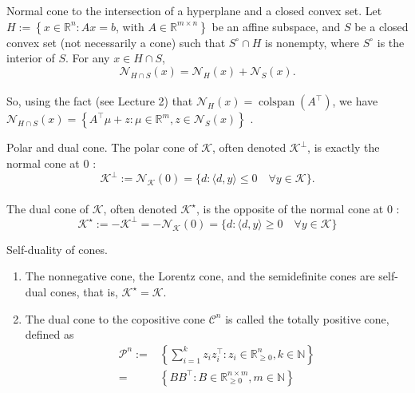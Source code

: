 \begin{theorem}[L9.1]{Normal cone to the intersection of a hyperplane and a closed convex set.}
    Let $H:=\left\{x \in \mathbb{R}^n: A x=b\right.$, with $\left.A \in \mathbb{R}^{m \times n}\right\}$ be an affine subspace, and $S$ be a closed convex set (not necessarily a cone) such that $S^{\circ} \cap H$ is nonempty, where $S^{\circ}$ is the interior of $S$. For any $x \in H \cap S$,
    \vspace{-4pt}\\
    $$
    \mathcal{N}_{H \cap S}(x)=\mathcal{N}_H(x)+\mathcal{N}_S(x) .
    $$
    \vspace{-5pt}\\
    So, using the fact (see Lecture 2) that $\mathcal{N}_H(x)=\operatorname{colspan}\left(A^{\top}\right)$, we have
    $\mathcal{N}_{H \cap S}(x)=\left\{A^{\top} \mu+z: \mu \in \mathbb{R}^m, z \in \mathcal{N}_S(x)\right\}$ .
\end{theorem}

\begin{remark}[L9.1]{Polar and dual cone.}
    The polar cone of $\mathcal{K}$, often denoted $\mathcal{K}^{\perp}$, is exactly the normal cone at 0 :
    \vspace{-4pt}\\
    $$
    \mathcal{K}^{\perp}:=\mathcal{N}_{\mathcal{K}}(0)=\{d:\langle d, y\rangle \leq 0 \quad \forall y \in \mathcal{K}\} .
    $$
    \vspace{-7pt}\\
    The dual cone of $\mathcal{K}$, often denoted $\mathcal{K}^{\star}$, is the opposite of the normal cone at 0 :
    \vspace{-4pt}\\
    $$
    \mathcal{K}^{\star}:=-\mathcal{K}^{\perp}=-\mathcal{N}_{\mathcal{K}}(0)=\{d:\langle d, y\rangle \geq 0 \quad \forall y \in \mathcal{K}\}
    $$
    \vspace{-7pt}
\end{remark}

\begin{theorem}[L9.2]{Self-duality of cones.}
\begin{enumerate}[leftmargin=*]
    \item The nonnegative cone, the Lorentz cone, and the semidefinite cones are self-dual cones, that is, $\mathcal{K}^{\star}=\mathcal{K}$.
    \item The dual cone to the copositive cone $\mathcal{C}^n$ is called the totally positive cone, defined as
    \vspace{-4pt}\\
    $$
    \begin{aligned}
        \mathcal{P}^n:=&\left\{\sum_{i=1}^k z_i z_i^{\top}: z_i \in \mathbb{R}_{\geq 0}^n, k \in \mathbb{N}\right\}\\
        =&\left\{B B^{\top}: B \in \mathbb{R}_{\geq 0}^{n \times m}, m \in \mathbb{N}\right\}
    \end{aligned}
    $$
    \vspace{-4pt}
\end{enumerate}
\end{theorem}

